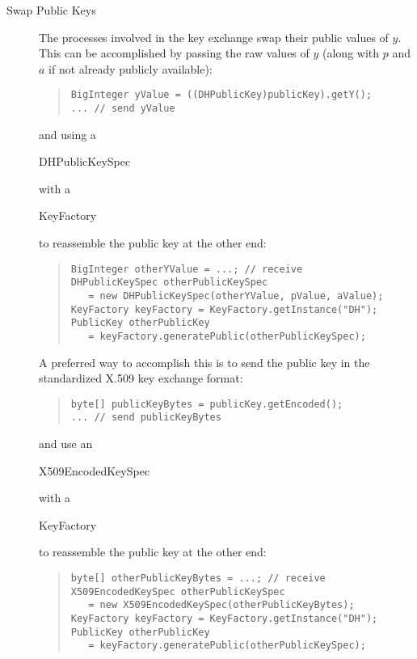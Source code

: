 \begin{description}
  \item[Swap Public Keys]
  The processes involved in the key exchange swap their public values of $y$.
  This can be accomplished by passing the raw values of $y$
  (along with $p$ and $a$ if not already publicly available):
\begin{quote}\begin{code}\begin{verbatim}
BigInteger yValue = ((DHPublicKey)publicKey).getY();
... // send yValue
\end{verbatim}\end{code}\end{quote}
  and using a \begin{code}DHPublicKeySpec\end{code} with a \begin{code}KeyFactory\end{code}
  to reassemble the public key at the other end:
\begin{quote}\begin{code}\begin{verbatim}
BigInteger otherYValue = ...; // receive
DHPublicKeySpec otherPublicKeySpec
   = new DHPublicKeySpec(otherYValue, pValue, aValue);
KeyFactory keyFactory = KeyFactory.getInstance("DH");
PublicKey otherPublicKey
   = keyFactory.generatePublic(otherPublicKeySpec);
\end{verbatim}\end{code}\end{quote}
  A preferred way to accomplish this is to send the public key in the
  standardized X.509 key exchange format:
\begin{quote}\begin{code}\begin{verbatim}
byte[] publicKeyBytes = publicKey.getEncoded();
... // send publicKeyBytes
\end{verbatim}\end{code}\end{quote}
  and use an \begin{code}X509EncodedKeySpec\end{code} with a \begin{code}KeyFactory\end{code}
  to reassemble the public key at the other end:
\begin{quote}\begin{code}\begin{verbatim}
byte[] otherPublicKeyBytes = ...; // receive
X509EncodedKeySpec otherPublicKeySpec
   = new X509EncodedKeySpec(otherPublicKeyBytes);
KeyFactory keyFactory = KeyFactory.getInstance("DH");
PublicKey otherPublicKey
   = keyFactory.generatePublic(otherPublicKeySpec);
\end{verbatim}\end{code}\end{quote}


\end{description}
